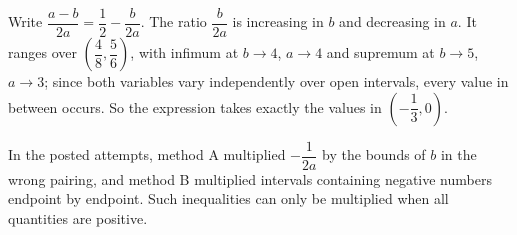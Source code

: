 Write $\dfrac{a-b}{2a}=\dfrac12-\dfrac b{2a}$. The ratio $\dfrac b{2a}$ is increasing in $b$ and decreasing in $a$. It ranges over $\left(\dfrac4{8},\dfrac5{6}\right)$, with infimum at $b\to4$, $a\to4$ and supremum at $b\to5$, $a\to3$; since both variables vary independently over open intervals, every value in between occurs. So the expression takes exactly the values in $\boxed{\left(-\dfrac13,0\right)}$.

In the posted attempts, method A multiplied $-\dfrac1{2a}$ by the bounds of $b$ in the wrong pairing, and method B multiplied intervals containing negative numbers endpoint by endpoint. Such inequalities can only be multiplied when all quantities are positive.
